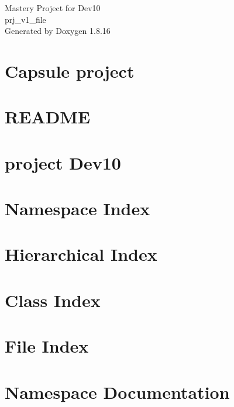 \let\mypdfximage\pdfximage\def\pdfximage{\immediate\mypdfximage}\documentclass[twoside]{book}
\newcommand{\+}{\discretionary{\mbox{\scriptsize$\hookleftarrow$}}{}{}}
\newcommand{\clearemptydoublepage}{%
  \newpage{\pagestyle{empty}\cleardoublepage}%
}
\begin{document}
\hypersetup{pageanchor=false,
             bookmarksnumbered=true,
             pdfencoding=unicode
            }
\begin{titlepage}
\vspace*{7cm}
\begin{center}%
{\Large Mastery Project for Dev10 \\[1ex]\large prj\+\_\+v1\+\_\+file }\\
\vspace*{1cm}
{\large Generated by Doxygen 1.8.16}\\
\end{center}
\end{titlepage}
\clearemptydoublepage
{}
\tableofcontents
\clearemptydoublepage
{}
\hypersetup{pageanchor=true}

\chapter{Capsule project}
\label{index}\hypertarget{index}{}
\chapter{R\+E\+A\+D\+ME}
\label{md_docs__r_e_a_d_m_e}

\chapter{project Dev10}
\label{_mastery}

\chapter{Namespace Index}

\chapter{Hierarchical Index}

\chapter{Class Index}

\chapter{File Index}

\chapter{Namespace Documentation}






\end{document}
